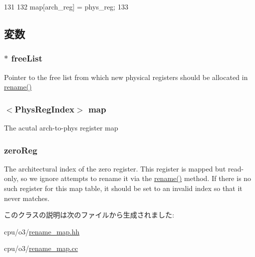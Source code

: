 \begin{DoxyCode}
131     {
132         map[arch_reg] = phys_reg;
133     }
\end{DoxyCode}


\subsection{変数}
\hypertarget{classSimpleRenameMap_a5d2c433781e53552fb56d17e81d4b6bd}{
\subsubsection[{freeList}]{$\ast$ {\bf freeList}}}
\label{classSimpleRenameMap_a5d2c433781e53552fb56d17e81d4b6bd}
Pointer to the free list from which new physical registers should be allocated in \hyperlink{classSimpleRenameMap_a18370a31dd17baa3a67d1ce3e0f43885}{rename()} \hypertarget{classSimpleRenameMap_a20955fcac3b8535e6b1237aa7ba0cccf}{
\subsubsection[{map}]{$<${\bf PhysRegIndex}$>$ {\bf map}}}
\label{classSimpleRenameMap_a20955fcac3b8535e6b1237aa7ba0cccf}
The acutal arch-\/to-\/phys register map \hypertarget{classSimpleRenameMap_a13b7cf8d0c4baf190d7e75e372c74d86}{
\subsubsection[{zeroReg}]{ {\bf zeroReg}}}
\label{classSimpleRenameMap_a13b7cf8d0c4baf190d7e75e372c74d86}
The architectural index of the zero register. This register is mapped but read-\/only, so we ignore attempts to rename it via the \hyperlink{classSimpleRenameMap_a18370a31dd17baa3a67d1ce3e0f43885}{rename()} method. If there is no such register for this map table, it should be set to an invalid index so that it never matches. 

このクラスの説明は次のファイルから生成されました:\begin{DoxyCompactItemize}
\item 
cpu/o3/\hyperlink{rename__map_8hh}{rename\_\-map.hh}\item 
cpu/o3/\hyperlink{rename__map_8cc}{rename\_\-map.cc}\end{DoxyCompactItemize}
